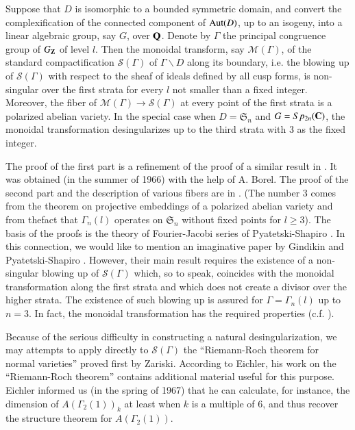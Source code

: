 Suppose that $D$ is isomorphic to a bounded symmetric domain, and convert the complexification of the connected component of $\operatorname{\mathrm{Aut}}(D)$, up to an isogeny, into a linear algebraic group, say $G$, over $\mathbf{Q}$. Denote by $\Gamma$ the principal congruence group of $G_{\mathbf{Z}}$ of level $l$. Then the monoidal transform, say $\mathscr{M}(\Gamma)$, of the standard compactification $\mathscr{S}(\Gamma)$ of $\Gamma\backslash D$ along its boundary, i.e. the blowing up of $\mathscr{S}(\Gamma)$ with respect to the sheaf of ideals defined by all cusp forms, is non-singular over the first strata for every $l$ not smaller than a fixed integer. Moreover, the fiber of $\mathscr{M}(\Gamma)\to \mathscr{S}(\Gamma)$ at every point of the first strata is a polarized abelian variety. In the special case when $D=\mathfrak{S}_{n}$ and $G=Sp_{2n}(\mathbf{C})$, the monoidal transformation desingularizes up to the third strata with 3 as the fixed integer.

The proof of the first part is a refinement of the proof of a similar result in \cite{art12-key10}. It was obtained (in the summer of 1966) with the help of A. Borel. The proof of the second part and the description of various fibers are in \cite{art12-key11}. (The number 3 comes from the theorem on projective embeddings of a polarized abelian variety and from the\pageoriginale fact that $\Gamma_{n}(l)$ operates on $\mathfrak{S}_{n}$ without fixed points for $l\geq 3$). The basis of the proofs is the theory of Fourier-Jacobi series of Pyatetski-Shapiro \cite{art12-key17}. In this connection, we would like to mention an imaginative paper by Gindikin and Pyatetski-Shapiro \cite{art12-key7}. However, their main result requires the existence of a non-singular blowing up of $\mathscr{S}(\Gamma)$ which, so to speak, coincides with the monoidal transformation along the first strata and which does not create a divisor over the higher strata. The existence of such blowing up is assured for $\Gamma=\Gamma_{n}(l)$ up to $n=3$. In fact, the monoidal transformation has the required properties (c.f. \cite{art12-key11}).

Because of the serious difficulty in constructing a natural desingularization, we may attempts to apply directly to $\mathscr{S}(\Gamma)$ the ``Riemann-Roch theorem for normal varieties'' proved first by Zariski. According to Eichler, his work on the ``Riemann-Roch theorem'' \cite{art12-key6} contains additional material useful for this purpose. Eichler informed us (in the spring of 1967) that he can calculate, for instance, the dimension of $A(\Gamma_{2}(1))_{k}$ at least when $k$ is a multiple of $6$, and thus recover the structure theorem for $A(\Gamma_{2}(1))$.

